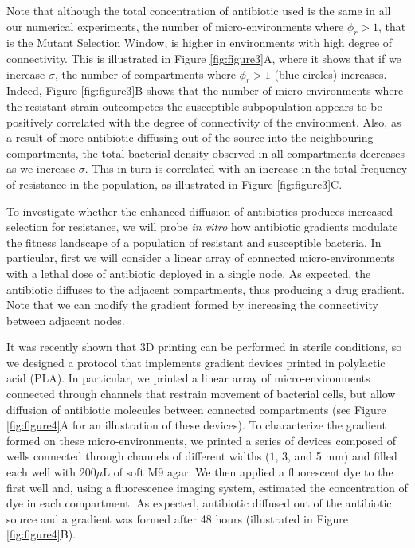 \documentclass[fleqn,12pt]{wlscirep}
\begin{document}
Note that although the total concentration of antibiotic used is the same in all our numerical experiments, the number of micro-environments where $\phi_r>1$, that is the Mutant Selection Window, is higher in environments with high degree of connectivity. This is illustrated in Figure \ref{fig:figure3}A, where it shows that if we increase $\sigma$, the number of compartments where $\phi_r>1$ (blue circles) increases. Indeed, Figure \ref{fig:figure3}B shows that the number of micro-environments where the resistant strain outcompetes the susceptible subpopulation appears to be positively correlated with the degree of connectivity of the environment. 
Also, as a result of more antibiotic diffusing out of the source into the neighbouring compartments, the total bacterial density observed in all compartments decreases as we increase $\sigma$.  This in turn is correlated with an increase in the total frequency of resistance in the population, as illustrated in Figure \ref{fig:figure3}C.


To investigate whether the enhanced diffusion of antibiotics produces increased selection for resistance, we will probe {\em in vitro} how antibiotic gradients modulate the fitness landscape of a population of resistant and susceptible bacteria. In particular, first we will consider a linear array of connected micro-environments with a lethal dose of antibiotic deployed in a single node. As expected, the antibiotic diffuses to the adjacent compartments, thus producing a drug gradient. Note that we can modify the gradient formed by increasing the connectivity between adjacent nodes.

It was recently shown that 3D printing can be performed in sterile conditions\cite{Neches2016}, so we designed a protocol that implements gradient devices printed in polylactic acid (PLA). In particular, we printed a linear array of micro-environments connected through channels that restrain movement of bacterial cells, but allow diffusion of antibiotic molecules between connected compartments (see Figure \ref{fig:figure4}A for an illustration of these devices). 
To characterize the gradient formed on these micro-environments, we printed a series of devices composed of wells connected through channels of different widths ($1$, $3$, and 5 mm) and filled each well with $200 \mu$L of soft M9 agar. We then applied a fluorescent dye to the first well and, using a fluorescence imaging system, estimated the concentration of dye in each compartment. As expected, antibiotic diffused out of the antibiotic source and a gradient was formed after 48 hours (illustrated in Figure \ref{fig:figure4}B).  
\end{document}

